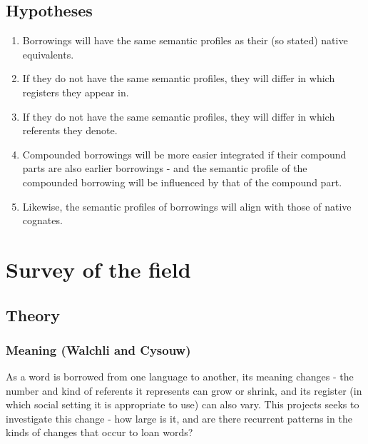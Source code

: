 \documentclass[a4paper]{article}
\begin{document}
\subsection{Hypotheses}
\begin{enumerate}
	\item Borrowings will have the same semantic profiles as their (so stated) native equivalents.
	\item If they do not have the same semantic profiles, they will differ in which registers they appear in.
	\item If they do not have the same semantic profiles, they will differ in which referents they denote.
	\item Compounded borrowings will be more easier integrated if their compound parts are also earlier borrowings - and the semantic profile of the compounded borrowing will be influenced by that of the compound part.
	\item Likewise, the semantic profiles of borrowings will align with those of native cognates.
	
\end{enumerate}



\section{Survey of the field}


\subsection{Theory}


\subsubsection{Meaning (Walchli and Cysouw)}
As a word is borrowed from one language to another, its meaning changes - the number and kind of referents it represents can grow or shrink, and its register (in which social setting it is appropriate to use) can also vary. This projects seeks to investigate this change - how large is it, and are there recurrent patterns in the kinds of changes that occur to loan words?
\end{document}
